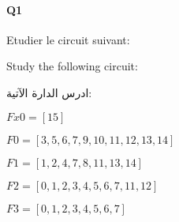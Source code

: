 



\pagebreak

\paragraph{Q1}



Etudier le circuit suivant:



Study the following circuit:

\begin{arab}[utf]
ادرس الدارة الآتية:
\end{arab}

 

$Fx0 = [15]$



$F0 = [3, 5, 6, 7, 9, 10, 11, 12, 13, 14]$



$F1 = [1, 2, 4, 7, 8, 11, 13, 14]$



$F2 = [0, 1, 2, 3, 4, 5, 6, 7, 11, 12]$



$F3 = [0, 1, 2, 3, 4, 5, 6, 7]$



